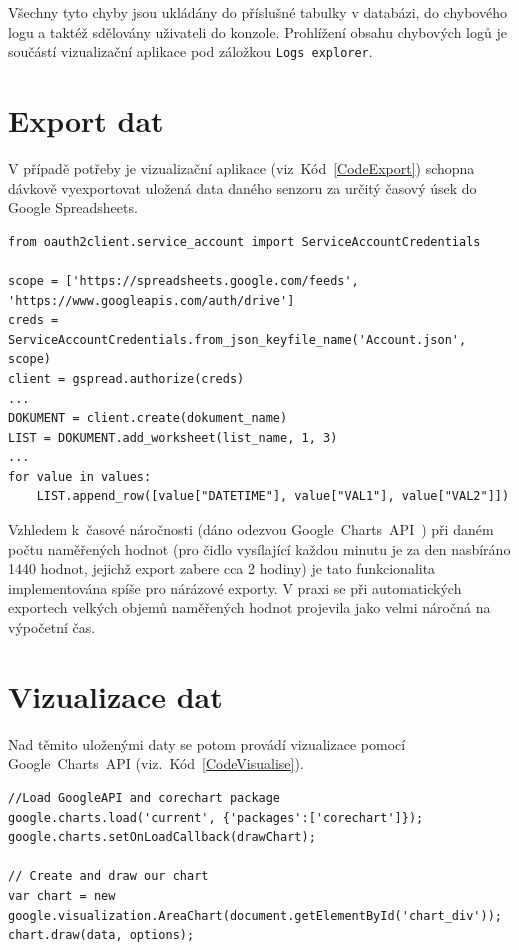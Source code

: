 Všechny tyto chyby jsou ukládány do příslušné tabulky v databázi, do chybového logu a taktéž sdělovány uživateli do konzole.
Prohlížení obsahu chybových logů je součástí vizualizační aplikace pod záložkou \texttt{Logs explorer}.


\section{Export dat}
V případě potřeby je vizualizační aplikace (viz~Kód~\ref{CodeExport}) schopna dávkově vyexportovat uložená data daného senzoru za určitý časový úsek do Google Spreadsheets. 

\begin{lstlisting}[caption={Ukázka exportu dat},captionpos=b,label=CodeExport,style=MyCodePython]
from oauth2client.service_account import ServiceAccountCredentials

scope = ['https://spreadsheets.google.com/feeds', 'https://www.googleapis.com/auth/drive']
creds = ServiceAccountCredentials.from_json_keyfile_name('Account.json', scope)
client = gspread.authorize(creds)
...
DOKUMENT = client.create(dokument_name)
LIST = DOKUMENT.add_worksheet(list_name, 1, 3)
...
for value in values:
	LIST.append_row([value["DATETIME"], value["VAL1"], value["VAL2"]])
\end{lstlisting}
\vspace{-10pt}

Vzhledem k~časové náročnosti (dáno odezvou Google~Charts~API~\cite{uvod_google_charts_api}) při daném počtu naměřených hodnot (pro čidlo vysílající každou minutu je za den nasbíráno 1440 hodnot, jejichž export zabere cca 2 hodiny) je tato funkcionalita implementována spíše pro nárázové exporty. V praxi se při automatických exportech velkých objemů naměřených hodnot projevila jako velmi náročná na výpočetní čas.

\section{Vizualizace dat}
\label{SectionVizualizaceDat2}
Nad těmito uloženými daty se potom provádí vizualizace pomocí Google~Charts~API (viz.~Kód~\ref{CodeVisualise}). 

\begin{lstlisting}[caption={Ukázka vizualizace dat},captionpos=b,label=CodeVisualise,style=MyCodePython]
//Load GoogleAPI and corechart package
google.charts.load('current', {'packages':['corechart']});
google.charts.setOnLoadCallback(drawChart);     

// Create and draw our chart
var chart = new google.visualization.AreaChart(document.getElementById('chart_div'));
chart.draw(data, options);
\end{lstlisting}

